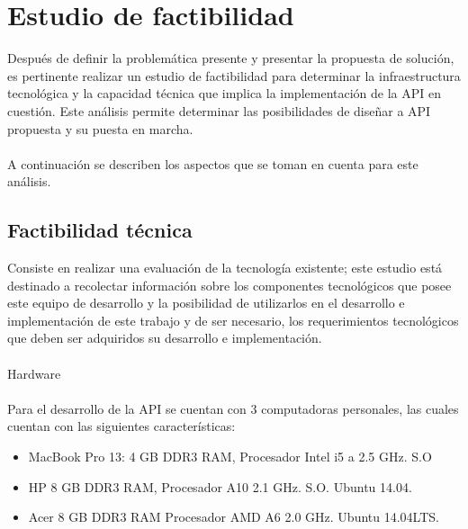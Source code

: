 \section{Estudio de factibilidad}
Después de definir la problemática presente y presentar la propuesta de solución, es  pertinente realizar un estudio de factibilidad para determinar la infraestructura tecnológica y la capacidad técnica que implica la implementación de la API en cuestión. Este análisis permite determinar las posibilidades de diseñar a API propuesta y su puesta en marcha. 
\\\\
A continuación se describen los aspectos que se toman en cuenta para este análisis.
\subsection{Factibilidad técnica }
Consiste en realizar una evaluación de la tecnología existente; este estudio está destinado a recolectar información sobre los componentes tecnológicos que posee este equipo de desarrollo y la posibilidad de utilizarlos en el desarrollo e implementación de este trabajo y de ser necesario, los requerimientos tecnológicos que deben ser adquiridos su desarrollo e implementación. 
\\\\
Hardware 
\\\\
Para el desarrollo de la API se cuentan con 3 computadoras personales, las cuales cuentan 
con las siguientes características:
\begin{itemize}
	\item MacBook Pro 13: 4 GB DDR3 RAM, Procesador Intel i5 a 2.5 GHz. S.O
	\item HP 8 GB DDR3 RAM, Procesador A10 2.1 GHz. S.O. Ubuntu 14.04.
	\item Acer 8 GB DDR3 RAM Procesador AMD A6 2.0 GHz. Ubuntu 14.04LTS.
\end{itemize}


